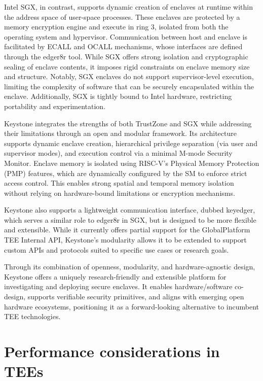 Intel SGX, in contrast, supports dynamic creation of enclaves at runtime within the address space of user-space processes. These enclaves are protected by a memory encryption engine and execute in ring 3, isolated from both the operating system and hypervisor. Communication between host and enclave is facilitated by ECALL and OCALL mechanisms, whose interfaces are defined through the edger8r tool. While SGX offers strong isolation and cryptographic sealing of enclave contents, it imposes rigid constraints on enclave memory size and structure. Notably, SGX enclaves do not support supervisor-level execution, limiting the complexity of software that can be securely encapsulated within the enclave. Additionally, SGX is tightly bound to Intel hardware, restricting portability and experimentation.

Keystone integrates the strengths of both TrustZone and SGX while addressing their limitations through an open and modular framework. Its architecture supports dynamic enclave creation, hierarchical privilege separation (via user and supervisor modes), and execution control via a minimal M-mode Security Monitor. Enclave memory is isolated using RISC-V’s Physical Memory Protection (PMP) features, which are dynamically configured by the SM to enforce strict access control. This enables strong spatial and temporal memory isolation without relying on hardware-bound limitations or encryption mechanisms.

Keystone also supports a lightweight communication interface, dubbed keyedger, which serves a similar role to edger8r in SGX, but is designed to be more flexible and extensible. While it currently offers partial support for the GlobalPlatform TEE Internal API, Keystone’s modularity allows it to be extended to support custom APIs and protocols suited to specific use cases or research goals.



Through its combination of openness, modularity, and hardware-agnostic design, Keystone offers a uniquely research-friendly and extensible platform for investigating and deploying secure enclaves. It enables hardware/software co-design, supports verifiable security primitives, and aligns with emerging open hardware ecosystems, positioning it as a forward-looking alternative to incumbent TEE technologies.

\section{Performance considerations in TEEs}